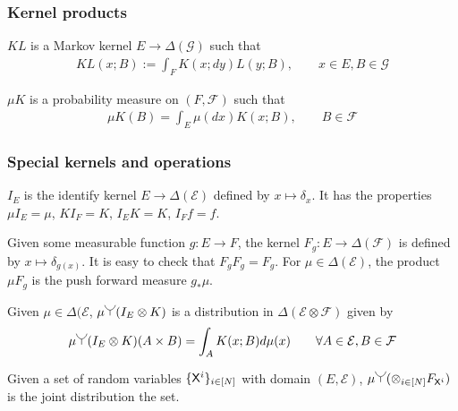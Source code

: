 \subsubsection{Kernel products}

$KL$ is a Markov kernel $E\to \Delta(\mathcal{G})$ such that
\begin{align}
    KL(x;B):= \int_F K(x;dy) L(y;B),\qquad x\in E, B\in \mathcal{G}
\end{align}

$\mu K$ is a probability measure on $(F,\mathcal{F})$ such that
\begin{align}
    \mu K(B)=\int_E \mu(dx) K(x;B),\qquad B\in\mathcal{F}
\end{align}

\subsubsection{Special kernels and operations}

$I_E$ is the identify kernel $E\to \Delta(\mathcal{E})$ defined by $x\mapsto \delta_x$. It has the properties $\mu I_E=\mu$, $KI_F = K$, $I_E K = K$, $I_F f=f$.

Given some measurable function $g:E\to F$, the kernel $F_g:E\to \Delta(\mathcal{F})$ is defined by $x\mapsto \delta_{g(x)}$. It is easy to check that $F_g F_g = F_g$. For $\mu\in \Delta(\mathcal{E})$, the product $\mu F_g$ is the push forward measure $g_*\mu$. 

Given $\mu\in \Delta(\mathcal{E}$, $\mu\splitter{0.15}(I_E\otimes K)$ is a distribution in $\Delta(\mathcal{E}\otimes\mathcal{F})$ given by
\begin{align}
    \mu\splitter{0.15}(I_E\otimes K)(A\times B) = \int_A K(x;B) d\mu(x)\qquad \forall A\in \mathcal{E},B\in \mathcal{F}
\end{align}

Given a set of random variables $\{\mathsf{X}^i\}_{i\in[N]}$ with domain $(E,\mathcal{E})$,  $\mu\splitter{0.15}(\otimes_{i\in[N]} F_{\RV{X}^i})$ is the joint distribution the set.